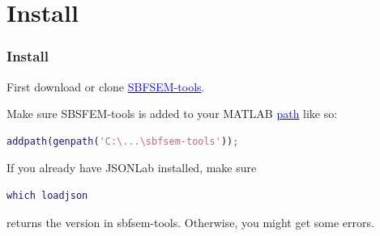 \documentclass[11pt]{beamer}
\begin{document}
\section{Install}
\begin{frame}[fragile]
	\frametitle{Install}
	First download or clone \href{www.github.com/sarastokes/sbfsem-tools}{\textcolor{blue}{SBFSEM-tools}}.
	
	Make sure SBSFEM-tools is added to your MATLAB \href{https://www.mathworks.com/help/matlab/ref/addpath.html}{\textcolor{blue}{path}} like so:
	\begin{lstlisting}[language=matlab]	
	addpath(genpath('C:\...\sbfsem-tools'));\end{lstlisting}
	If you already have JSONLab installed, make sure 
	\begin{lstlisting}[language=matlab] 
	which loadjson\end{lstlisting} 
	returns the version in sbfsem-tools. Otherwise, you might get some errors.
\end{frame}
\end{document}
